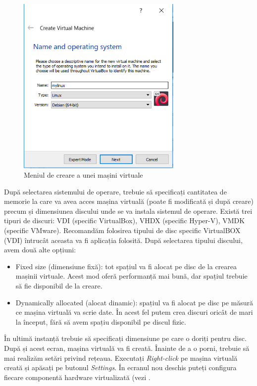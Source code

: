 \begin{figure}[!htbp]
	\centering
	\includegraphics[width=8cm]{chapters/14-vm/img/vbox-create-img.png}
	\caption{Meniul de creare a unei mașini virtuale}
	\label{fig:vm-vbox-create}
\end{figure}

După selectarea sistemului de operare, trebuie să specificați cantitatea de
memorie la care va avea acces mașina virtuală (poate fi modificată și după
creare) precum și dimensiunea discului unde se va instala sistemul de operare.
Există trei tipuri de discuri: VDI (specific VirtualBox), VHDX (specific
Hyper-V), VMDK (specific VMware). Recomandăm folosirea tipului de disc specific
VirtualBOX (VDI) întrucât aceasta va fi aplicația folosită. După selectarea
tipului discului, avem două alte opțiuni:

\begin{itemize}
	\item Fixed size (dimensiune fixă): tot spațiul va fi alocat pe disc de
		la crearea mașinii virtuale. Acest mod oferă performanță mai
		bună, dar spațiul trebuie să fie disponibil de la creare.
	\item Dynamically allocated (alocat dinamic): spațiul va fi alocat pe
		disc pe măsură ce mașina virtuală va scrie date. În acest fel
		putem crea discuri oricât de mari la început, fără să avem
		spațiu disponibil pe discul fizic.
\end{itemize}

În ultimă instanță trebuie să specificați dimensiune pe care o doriți pentru
disc. După și acest ecran, mașina virtuală va fi creată. Înainte de a o porni,
trebuie să mai realizăm setări privind rețeaua. Executați \textit{Right-click}
pe mașina virtuală creată și apăsați pe butonul \textit{Settings}. În ecranul
nou deschis puteți configura fiecare componentă hardware virtualizată (vezi
.

